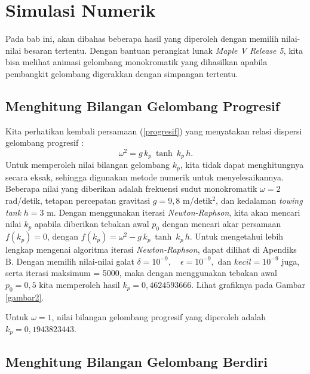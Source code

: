 \documentclass[12pt,a4paper]{report}
\begin{document}
\chapter{Simulasi Numerik}

Pada bab ini, akan dibahas beberapa hasil yang diperoleh dengan memilih
nilai-nilai besaran tertentu. Dengan bantuan perangkat lunak \textit{Maple V
Release 5}, kita bisa melihat animasi gelombang monokromatik yang dihasilkan
apabila pembangkit gelombang digerakkan dengan simpangan tertentu.

\section{Menghitung Bilangan Gelombang Progresif} 		\label{NR1}

Kita perhatikan kembali persamaan (\ref{progresif}) yang menyatakan relasi
dispersi gelombang progresif :
\begin{equation}
\omega^2 = g\,k_{p}\: \tanh\: k_{p}\,h.
\end{equation}
Untuk memperoleh nilai bilangan gelombang $k_{p}$, kita tidak dapat
menghitungnya secara eksak, sehingga digunakan metode numerik untuk
menyelesaikannya. Beberapa nilai yang diberikan adalah frekuensi sudut
monokromatik $\omega = 2$ rad/detik, tetapan percepatan gravitasi $g = 9,8 $
m/detik$^2$, dan kedalaman \textit{towing tank} $h = 3$ m. Dengan
menggunakan iterasi \textit{Newton-Raphson}, kita akan mencari nilai $k_{p}$
apabila diberikan tebakan awal $p_{0}$ dengan mencari akar persamaan $%
f(k_{p})=0$, dengan $f(k_{p}) = \omega^2 - g\,k_{p}\: \tanh\: k_{p}\,h$.
Untuk mengetahui lebih lengkap mengenai algoritma iterasi \textit{%
Newton-Raphson}, dapat dilihat di Apendiks B. Dengan memilih nilai-nilai
galat $\delta = 10^{-9}, \quad \epsilon = 10^{-9},$ dan $kecil = 10^{-9}$
juga, serta iterasi maksimum = 5000, maka dengan menggunakan tebakan awal $%
p_{0} = 0,5$ kita memperoleh hasil $k_{p} = 0,4624593666$. Lihat grafiknya
pada Gambar \ref{gambar2}.

Untuk $\omega = 1$, nilai bilangan gelombang progresif yang diperoleh adalah
$k_{p} = 0,1943823443$.

\section{Menghitung Bilangan Gelombang Berdiri} \label{NR2}
\end{document}
